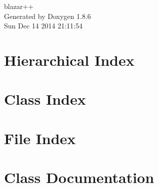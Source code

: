 \documentclass[twoside]{book}
\newcommand{\clearemptydoublepage}{%
  \newpage{\pagestyle{empty}\cleardoublepage}%
}
\begin{document}
\hypersetup{pageanchor=false}
\begin{titlepage}
\vspace*{7cm}
\begin{center}%
{\Large blazar++ }\\
\vspace*{1cm}
{\large Generated by Doxygen 1.8.6}\\
\vspace*{0.5cm}
{\small Sun Dec 14 2014 21:11:54}\\
\end{center}
\end{titlepage}
\clearemptydoublepage
\tableofcontents
\clearemptydoublepage
{}
\hypersetup{pageanchor=true}

\chapter{Hierarchical Index}

\chapter{Class Index}

\chapter{File Index}

\chapter{Class Documentation}
























\end{document}

